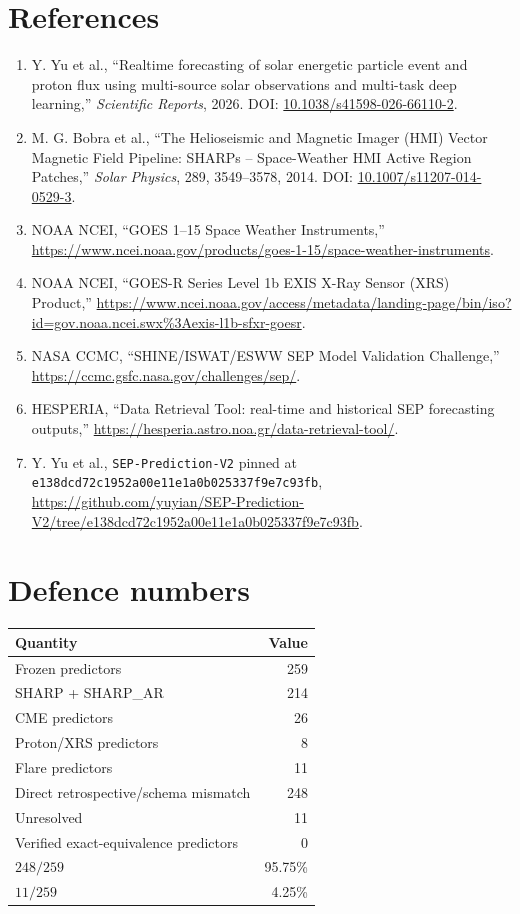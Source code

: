 \documentclass[11pt]{article}
\begin{document}
\section*{References}
\begin{enumerate}
\item Y. Yu et al., ``Realtime forecasting of solar energetic particle event and proton flux using multi-source solar observations and multi-task deep learning,'' \textit{Scientific Reports}, 2026. DOI: \href{https://doi.org/10.1038/s41598-026-66110-2}{10.1038/s41598-026-66110-2}.
\item M. G. Bobra et al., ``The Helioseismic and Magnetic Imager (HMI) Vector Magnetic Field Pipeline: SHARPs -- Space-Weather HMI Active Region Patches,'' \textit{Solar Physics}, 289, 3549--3578, 2014. DOI: \href{https://doi.org/10.1007/s11207-014-0529-3}{10.1007/s11207-014-0529-3}.
\item NOAA NCEI, ``GOES 1--15 Space Weather Instruments,'' \url{https://www.ncei.noaa.gov/products/goes-1-15/space-weather-instruments}.
\item NOAA NCEI, ``GOES-R Series Level 1b EXIS X-Ray Sensor (XRS) Product,'' \url{https://www.ncei.noaa.gov/access/metadata/landing-page/bin/iso?id=gov.noaa.ncei.swx%3Aexis-l1b-sfxr-goesr}.
\item NASA CCMC, ``SHINE/ISWAT/ESWW SEP Model Validation Challenge,'' \url{https://ccmc.gsfc.nasa.gov/challenges/sep/}.
\item HESPERIA, ``Data Retrieval Tool: real-time and historical SEP forecasting outputs,'' \url{https://hesperia.astro.noa.gr/data-retrieval-tool/}.
\item Y. Yu et al., \texttt{SEP-Prediction-V2} pinned at \texttt{e138dcd72c1952a00e11e1a0b025337f9e7c93fb}, \url{https://github.com/yuyian/SEP-Prediction-V2/tree/e138dcd72c1952a00e11e1a0b025337f9e7c93fb}.
\end{enumerate}

\appendix
\section{Defence numbers}
\begin{table}[h]\centering
\begin{tabular}{lr}\toprule Quantity & Value \\\midrule
Frozen predictors & 259 \\
SHARP + SHARP\_AR & 214 \\
CME predictors & 26 \\
Proton/XRS predictors & 8 \\
Flare predictors & 11 \\
Direct retrospective/schema mismatch & 248 \\
Unresolved & 11 \\
Verified exact-equivalence predictors & 0 \\
$248/259$ & 95.75\% \\
$11/259$ & 4.25\% \\\bottomrule
\end{tabular}\end{table}
\end{document}
